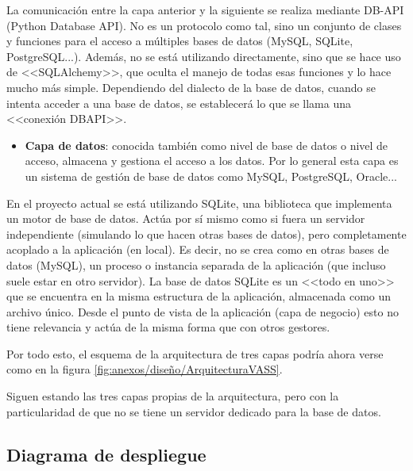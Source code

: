 La comunicación entre la capa anterior y la siguiente se realiza mediante DB-API
(Python Database API). No es un protocolo como tal, sino un conjunto de clases y
funciones para el acceso a múltiples bases de datos (MySQL, SQLite,
PostgreSQL...). Además, no se está utilizando directamente, sino que se hace uso
de <<SQLAlchemy>>, que oculta el manejo de todas esas funciones y lo hace mucho
más simple. Dependiendo del dialecto de la base de datos, cuando se intenta
acceder a una base de datos, se establecerá lo que se llama una <<conexión
DBAPI>>.

\begin{itemize}
    \item \textbf{Capa de datos}: conocida también como nivel de base de datos o
    nivel de acceso, almacena y gestiona el acceso a los datos. Por lo general
    esta capa es un sistema de gestión de base de datos como MySQL, PostgreSQL,
    Oracle...
\end{itemize}


En el proyecto actual se está utilizando SQLite, una biblioteca que implementa
un motor de base de datos. Actúa por sí mismo como si fuera un servidor
independiente \cite{sqlite} (simulando lo que hacen otras bases de datos), pero
completamente acoplado a la aplicación (en local). Es decir, no se crea como en
otras bases de datos (MySQL), un proceso o instancia separada de la aplicación
(que incluso suele estar en otro servidor). La base de datos SQLite es un <<todo
en uno>> que se encuentra en la misma estructura de la aplicación, almacenada
como un archivo único. Desde el punto de vista de la aplicación (capa de
negocio) esto no tiene relevancia y actúa de la misma forma que con otros
gestores.

Por todo esto, el esquema de la arquitectura de tres capas podría ahora verse
como en la figura \ref{fig:anexos/diseño/ArquitecturaVASS}.


Siguen estando las tres capas propias de la arquitectura, pero con la
particularidad de que no se tiene un servidor dedicado para la base de datos.

\subsection{Diagrama de despliegue}


